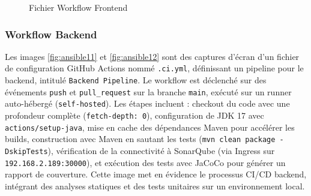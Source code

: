 \newpage
\begin{figure}[h]
    \begin{adjustwidth}{-3.5cm}{-3.5cm}
    \centering
    \caption{Fichier Workflow Frontend}
    \label{fig:ansible10}
    \end{adjustwidth}
\end{figure}
\subsubsection{Workflow Backend}
Les images \ref{fig:ansible11} et \ref{fig:ansible12} sont des captures d’écran d’un fichier de configuration GitHub Actions nommé \texttt{.ci.yml}, définissant un pipeline pour le backend, intitulé \texttt{Backend Pipeline}.
Le workflow est déclenché sur des événements \texttt{push} et \texttt{pull\_request} sur la branche \texttt{main}, exécuté sur un runner auto-hébergé (\texttt{self-hosted}).
Les étapes incluent : checkout du code avec une profondeur complète (\texttt{fetch-depth: 0}), configuration de JDK 17 avec \texttt{actions/setup-java}, mise en cache des dépendances Maven pour accélérer les builds, construction avec Maven en sautant les tests (\texttt{mvn clean package -DskipTests}), vérification de la connectivité à SonarQube (via Ingress sur \texttt{192.168.2.189:30000}), et exécution des tests avec JaCoCo pour générer un rapport de couverture.
Cette image met en évidence le processus CI/CD backend, intégrant des analyses statiques et des tests unitaires sur un environnement local.
\newpage

